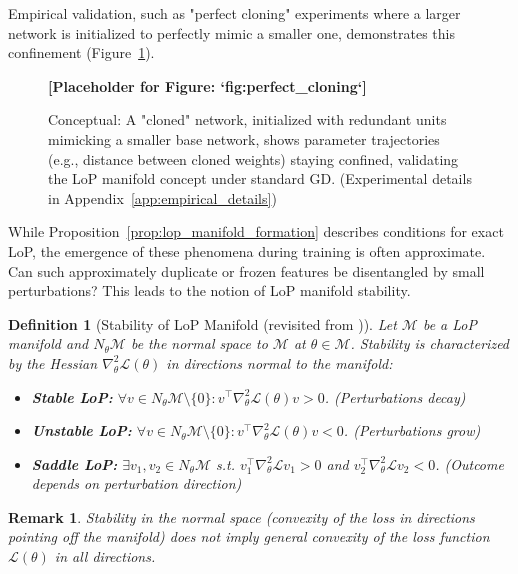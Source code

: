\documentclass{article}
\newcommand{\Loss}{\mathcal{L}}
\newtheorem{definition}{Definition}[section]
\newtheorem{remark}{Remark}[section]
\begin{document}
Empirical validation, such as "perfect cloning" experiments where a larger network is initialized to perfectly mimic a smaller one, demonstrates this confinement (Figure~\ref{fig:perfect_cloning_placeholder}).

\begin{figure}[ht!]
    \centering
    \textbf{[Placeholder for Figure: `fig:perfect_cloning`]}
    \caption{Conceptual: A "cloned" network, initialized with redundant units mimicking a smaller base network, shows parameter trajectories (e.g., distance between cloned weights) staying confined, validating the LoP manifold concept under standard GD. (Experimental details in Appendix~\ref{app:empirical_details})}
    \label{fig:perfect_cloning_placeholder}
\end{figure}

While Proposition~\ref{prop:lop_manifold_formation} describes conditions for exact LoP, the emergence of these phenomena during training is often approximate. Can such approximately duplicate or frozen features be disentangled by small perturbations? This leads to the notion of LoP manifold stability.

\begin{definition}[Stability of LoP Manifold (revisited from \citet{draft_placeholder_stability_def})]
\label{def:lop_stability_main}
Let $\mathcal{M}$ be a LoP manifold and $N_\theta\mathcal{M}$ be the normal space to $\mathcal{M}$ at $\theta \in \mathcal{M}$. Stability is characterized by the Hessian $\nabla_\theta^2\Loss(\theta)$ in directions normal to the manifold:
\begin{itemize}
    \item \textbf{Stable LoP:} $\forall v\in N_\theta\mathcal{M}\setminus\{0\}: v^\top\nabla_\theta^2\Loss(\theta)v > 0$. (Perturbations decay)
    \item \textbf{Unstable LoP:} $\forall v\in N_\theta\mathcal{M}\setminus\{0\}: v^\top\nabla_\theta^2\Loss(\theta)v < 0$. (Perturbations grow)
    \item \textbf{Saddle LoP:} $\exists v_1,v_2\in N_\theta\mathcal{M}$ s.t. $v_1^\top\nabla_\theta^2\Loss v_1>0$ and $v_2^\top\nabla_\theta^2\Loss v_2<0$. (Outcome depends on perturbation direction)
\end{itemize}
\end{definition}

\begin{remark}
Stability in the normal space (convexity of the loss in directions pointing off the manifold) does not imply general convexity of the loss function $\Loss(\theta)$ in all directions.
\end{remark}
\end{document}

